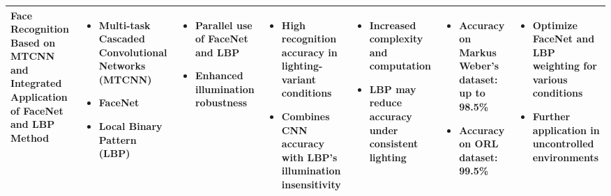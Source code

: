 \documentclass{article}
\begin{document}
\begin{adjustbox}{width=\textwidth}
\begin{tabular}{|p{}|p{}|p{}|p{}|p{}|p{}|p{}|}
        \hline
    Face Recognition Based on MTCNN and Integrated Application of FaceNet and LBP Method & 
    \begin{itemize}[leftmargin=*]
        \item Multi-task Cascaded Convolutional Networks (MTCNN)
        \item FaceNet
        \item Local Binary Pattern (LBP)
    \end{itemize} & 
    \begin{itemize}[leftmargin=*]
        \item Parallel use of FaceNet and LBP
        \item Enhanced illumination robustness
    \end{itemize} & 
    \begin{itemize}[leftmargin=*]
        \item High recognition accuracy in lighting-variant conditions
        \item Combines CNN accuracy with LBP’s illumination insensitivity
    \end{itemize} & 
    \begin{itemize}[leftmargin=*]
        \item Increased complexity and computation
        \item LBP may reduce accuracy under consistent lighting
    \end{itemize} & 
    \begin{itemize}[leftmargin=*]
        \item Accuracy on Markus Weber’s dataset: up to 98.5\%
        \item Accuracy on ORL dataset: 99.5\%
    \end{itemize} & 
    \begin{itemize}[leftmargin=*]
        \item Optimize FaceNet and LBP weighting for various conditions
        \item Further application in uncontrolled environments
    \end{itemize} \\

    \hline

\end{tabular}
\end{adjustbox}

\newpage
\end{document}
